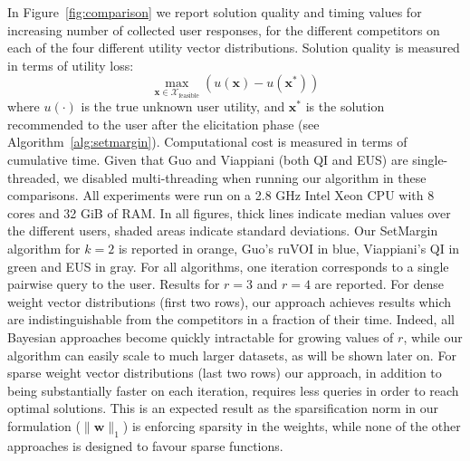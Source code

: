 \documentclass{article}
\renewcommand\[{\begin{equation}}
\renewcommand\]{\end{equation}}
\newcommand{\calvar}[1]{\ensuremath{\mathcal{#1}}}
\newcommand{\calX}{\calvar{X}}
\newcommand{\vecvar}[1]{\ensuremath{\boldsymbol{#1}}}
\newcommand{\vw}{\vecvar{w}}
\newcommand{\vx}{\vecvar{x}}
\newcommand{\andrea}[1]{{\bf \textcolor{blue}{{\fbox{Andrea:} #1}}}}
\newcommand{\stefano}[1]{{\bf \textcolor{green}{{\fbox{Stefano:} #1}}}}
\begin{document}

In Figure~\ref{fig:comparison} we report solution quality and timing
values for increasing number of collected user responses, for the
different competitors on each of the four different utility vector
distributions. Solution quality is measured in terms of utility loss:
%
$$ \max_{\vx\in\calX_\text{feasible}} \left( u(\vx) - u(\vx^*) \right) $$
%
where $u(\cdot)$ is the true unknown user utility, and $\vx^*$ is the
solution recommended to the user after the elicitation phase (see
Algorithm~\ref{alg:setmargin}). Computational cost is measured in
terms of cumulative time. Given that Guo and Viappiani (both QI and
EUS) are single-threaded, we disabled multi-threading when running our
algorithm in these comparisons. All experiments were run on a 2.8 GHz Intel
Xeon CPU with 8 cores and 32 GiB of RAM.
In all figures, thick lines indicate median values over the different
users, shaded areas indicate standard deviations. Our {\sc SetMargin}
algorithm for $k=2$ is reported in orange, Guo's ruVOI in blue, Viappiani's QI
in green and EUS in gray. For all algorithms, one iteration
corresponds to a single pairwise query to the user.  Results for $r=3$
and $r=4$ are reported.  For dense weight vector distributions (first
two rows), our approach achieves results which are indistinguishable
from the competitors in a fraction of their time.  Indeed, all
Bayesian approaches become quickly intractable for growing values of $r$,
while our algorithm can easily scale to much larger datasets, as will
be shown later on. For sparse weight vector distributions (last two
rows) our approach, in addition to being substantially faster on each
iteration, requires less queries in order to reach optimal
solutions. This is an expected result as the sparsification norm in
our formulation ($\| \vw \|_1$) is enforcing sparsity in the weights, 
while none of the other approaches is %
designed to favour sparse functions.



\end{document}
